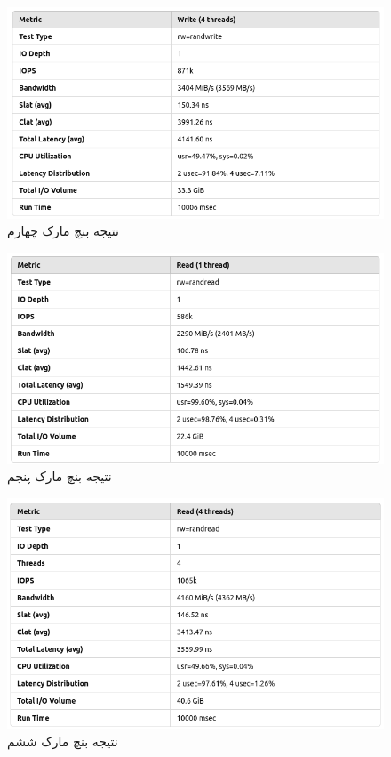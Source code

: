 \begin{figure}[H]
    \centering
    \includegraphics[width=\textwidth]{figs/b4.png}
    \caption{نتیجه بنچ مارک چهارم}
\end{figure}
\begin{figure}[H]
    \centering
    \includegraphics[width=\textwidth]{figs/b5.png}
    \caption{نتیجه بنچ مارک پنجم}
\end{figure}
\begin{figure}[H]
    \centering
    \includegraphics[width=\textwidth]{figs/b6.png}
    \caption{نتیجه بنچ مارک ششم}
\end{figure}


